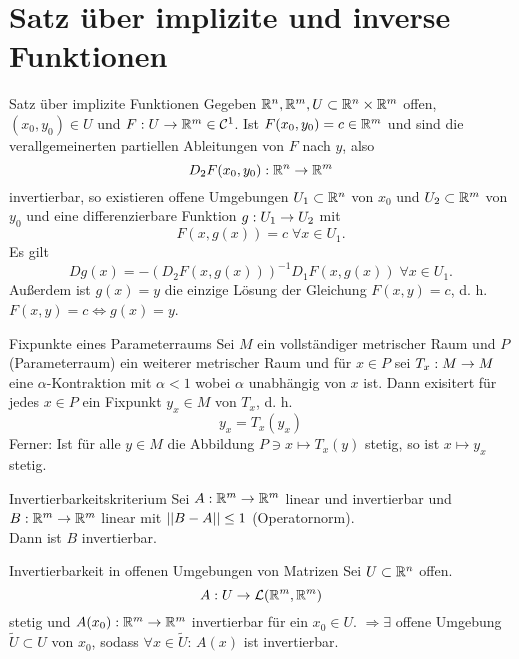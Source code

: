 \documentclass[main.tex]{subfiles}
\begin{document}
\section*{Satz über implizite und inverse Funktionen}

\begin{karte}{Satz über implizite Funktionen}
    Gegeben \( \mathbb{R}^n, \mathbb{R}^m, U \subset \mathbb{R}^n \times \mathbb{R}^m \) 
    offen, \( (x_0,y_0)\in U \) und \( F : U \rightarrow \mathbb{R}^m \in \mathcal{C}^1 \). 
    Ist \( F(x_0, y_0) = c\in \mathbb{R}^m \) und sind die verallgemeinerten partiellen 
    Ableitungen von \( F \) nach \( y \), also 
    \[ D_2 F(x_0, y_0) : \mathbb{R}^n \rightarrow \mathbb{R}^m \] 
    invertierbar, so existieren offene Umgebungen \( U_1 \subset \mathbb{R}^n \) 
    von \(x_0\) und \( U_2 \subset \mathbb{R}^m \) von \(y_0\) und eine 
    differenzierbare Funktion \( g : U_1 \rightarrow U_2 \) mit 
    \[ F(x, g(x)) = c \;\forall x\in U_1. \]
    Es gilt 
    \[ Dg(x) = -(D_2 F(x,g(x)))^{-1} D_1 F(x,g(x)) \;\forall x\in U_1. \]
    Außerdem ist \( g(x) = y \) die einzige Lösung der Gleichung 
    \( F(x,y) = c \), d. h. \( F(x,y) = c \Leftrightarrow g(x) = y \).
\end{karte}

\begin{karte}{Fixpunkte eines Parameterraums}
    Sei \( M \) ein vollständiger metrischer Raum und \( P \) 
    (Parameterraum) ein weiterer metrischer Raum und für \( x\in P \)     
    sei \(T_x : M \rightarrow M\) eine \(\alpha\)-Kontraktion mit \(\alpha < 1\)
    wobei \(\alpha\) unabhängig von \(x\) ist. Dann exisitert für jedes \(x \in P\)
    ein Fixpunkt \(y_x \in M\) von \(T_x\), d. h. 
    \[ y_x = T_x(y_x) \]
    Ferner: Ist für alle \(y \in M\) die Abbildung 
    \(P \ni x \mapsto T_x(y)\) stetig, so ist
    \( x \mapsto y_x \) stetig.
\end{karte}

\begin{karte}{Invertierbarkeitskriterium}
    Sei \( A : \mathbb{R}^m \rightarrow \mathbb{R}^m \) linear und 
    invertierbar und \( B : \mathbb{R}^m \rightarrow \mathbb{R}^m \) 
    linear mit \(\left|\left|B-A\right|\right| \leq 1\) (Operatornorm). \\
    Dann ist \( B \) invertierbar.
\end{karte}

\begin{karte}{Invertierbarkeit in offenen Umgebungen von Matrizen}
    Sei \( U \subset \mathbb{R}^n \) offen. 
    \[ A : U \rightarrow \mathcal{L}(\mathbb{R}^m, \mathbb{R}^m) \]
    stetig und \( A(x_0) : \mathbb{R}^m \rightarrow \mathbb{R}^m \) invertierbar 
    für ein \( x_0 \in U \). \( \Rightarrow \exists \) offene Umgebung 
    \( \tilde{U} \subset U \) von \( x_0 \), sodass \( \forall x \in \tilde{U} \): 
    \( A(x) \) ist invertierbar.
\end{karte}
\end{document}

